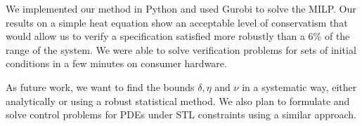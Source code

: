 \documentclass[oribibl]{llncs/llncs}
\begin{document}
We implemented our method in Python and used Gurobi to solve the MILP. Our
results on a simple heat equation show an acceptable level of conservatism that
would allow us to verify a specification satisfied more robustly than a 6\% of the range of
the system. We were able to solve verification problems for sets of initial conditions in a
few minutes on consumer hardware.

As future work, we want to find the bounds $\delta, \eta$ and $\nu$ in a
systematic way, either analytically or using a robust statistical method. We
also plan to formulate and solve control problems for PDEs under STL constraints
using a similar approach.



\end{document}
